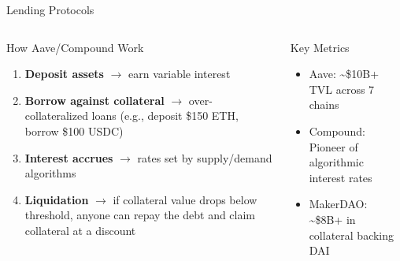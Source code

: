 \documentclass[8pt,aspectratio=169]{beamer}
\begin{document}
\begin{frame}{Lending Protocols}
\begin{columns}[T]
\begin{block}{How Aave/Compound Work}
\footnotesize
\begin{enumerate}
  \item \textbf{Deposit assets} $\rightarrow$ earn variable interest
  \item \textbf{Borrow against collateral} $\rightarrow$ over-collateralized loans (e.g., deposit \$150 ETH, borrow \$100 USDC)
  \item \textbf{Interest accrues} $\rightarrow$ rates set by supply/demand algorithms
  \item \textbf{Liquidation} $\rightarrow$ if collateral value drops below threshold, anyone can repay the debt and claim collateral at a discount
\end{enumerate}
\end{block}
\vspace{2mm}
\begin{exampleblock}{Key Metrics}
\footnotesize
\begin{itemize}
  \item Aave: \textasciitilde\$10B+ TVL across 7 chains
  \item Compound: Pioneer of algorithmic interest rates
  \item MakerDAO: \textasciitilde\$8B+ in collateral backing DAI
\end{itemize}
\end{exampleblock}


\end{columns}
\end{frame}
\end{document}
